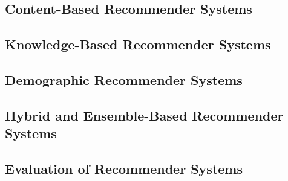 \documentclass[14pt]{article}
\begin{document}
		\subsection{Content-Based Recommender Systems}
		
		\subsection{Knowledge-Based Recommender Systems}
		
		\subsection{Demographic Recommender Systems}
		
		\subsection{Hybrid and Ensemble-Based Recommender Systems}
		
		\subsection{Evaluation of Recommender Systems}
		
\end{document}
